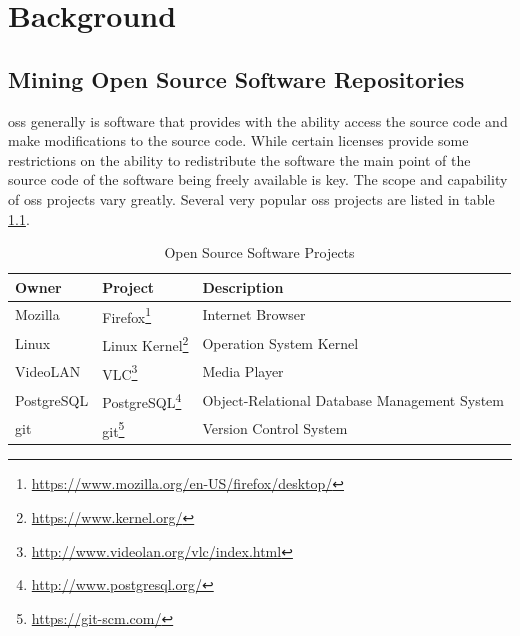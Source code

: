 \chapter{Background}
\label{chap:background}


\section{Mining Open Source Software Repositories}

\gls{oss} generally is software that provides with the ability access the source code and make modifications to the source code. While certain licenses provide some restrictions on the ability to redistribute the software the main point of the source code of the software being freely available is key. The scope and capability of \gls{oss} projects vary greatly. Several very popular \gls{oss} projects are listed in table \ref{tab:oss_projects}.

\begin{table}[h!]
\begin{minipage}{\textwidth}
\begin{center}
    \begin{tabular}{|l|l|l|}
        \hline
        Owner & Project & Description \\
        \hline

        Mozilla & Firefox\footnote{\url{https://www.mozilla.org/en-US/firefox/desktop/}} & Internet Browser \\
        Linux & Linux Kernel\footnote{\url{https://www.kernel.org/}} & Operation System Kernel \\
        VideoLAN & VLC\footnote{\url{http://www.videolan.org/vlc/index.html}} & Media Player \\
        PostgreSQL & PostgreSQL\footnote{\url{http://www.postgresql.org/}} & Object-Relational Database Management System \\
        git & git\footnote{\url{https://git-scm.com/}} & Version Control System \\
        \hline
    \end{tabular}
\end{center}
\caption{Open Source Software Projects}
\label{tab:oss_projects}
\end{minipage}
\end{table}

